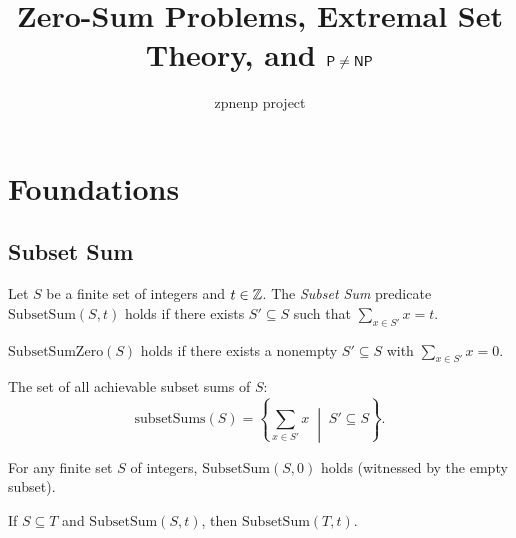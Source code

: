 %



\title{Zero-Sum Problems, Extremal Set Theory, and $\mathsf{P} \neq \mathsf{NP}$}
\author{zpnenp project}

\chapter{Foundations}

\section{Subset Sum}

\begin{definition}
  \label{def:subset_sum}
  \leanok
  Let $S$ be a finite set of integers and $t \in \mathbb{Z}$. The \emph{Subset Sum}
  predicate $\mathrm{SubsetSum}(S, t)$ holds if there exists $S' \subseteq S$
  such that $\sum_{x \in S'} x = t$.
\end{definition}

\begin{definition}
  \label{def:subset_sum_zero}
  \leanok
  $\mathrm{SubsetSumZero}(S)$ holds if there exists a nonempty $S' \subseteq S$
  with $\sum_{x \in S'} x = 0$.
\end{definition}

\begin{definition}
  \label{def:subset_sums}
  \leanok
  The set of all achievable subset sums of $S$:
  \[
    \mathrm{subsetSums}(S) = \left\{ \sum_{x \in S'} x \;\middle|\; S' \subseteq S \right\}.
  \]
\end{definition}

\begin{theorem}
  \label{thm:subset_sum_zero}
  \leanok
  For any finite set $S$ of integers, $\mathrm{SubsetSum}(S, 0)$ holds
  (witnessed by the empty subset).
\end{theorem}

\begin{theorem}[Monotonicity]
  \label{thm:subset_sum_mono}
  \leanok
  If $S \subseteq T$ and $\mathrm{SubsetSum}(S, t)$, then $\mathrm{SubsetSum}(T, t)$.
\end{theorem}

